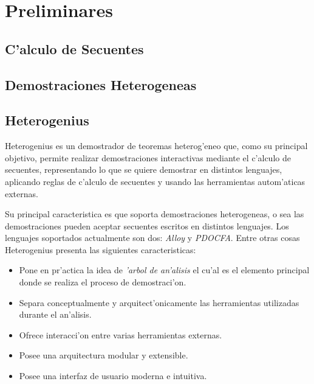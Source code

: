 \chapter{Preliminares}

\section{C'alculo de Secuentes}



\section{Demostraciones Heterogeneas}


\section{Heterogenius}

Heterogenius \cite{heterogenius} es un demostrador de teoremas heterog'eneo que, como su principal objetivo, permite realizar demostraciones interactivas mediante el c'alculo de secuentes, representando lo que se quiere demostrar en distintos lenguajes, aplicando reglas de c'alculo de secuentes y usando las herramientas autom'aticas externas. 

Su principal caracteristica es que soporta demostraciones heterogeneas, o sea las demostraciones pueden aceptar secuentes escritos en distintos lenguajes. Los lenguajes soportados actualmente son dos: \textit{Alloy} y \textit{PDOCFA}. Entre otras cosas Heterogenius presenta las siguientes caracteristicas:

\begin{itemize}

\item Pone en pr'actica la idea de \textit{'arbol de an'alisis} el cu'al es el elemento principal donde se realiza el proceso de demostraci'on.

\item Separa conceptualmente y arquitect'onicamente las herramientas utilizadas durante el an'alisis.

\item Ofrece interacci'on entre varias herramientas externas.

\item Posee una arquitectura modular y extensible.

\item Posee una interfaz de usuario moderna e intuitiva.

\end{itemize}

